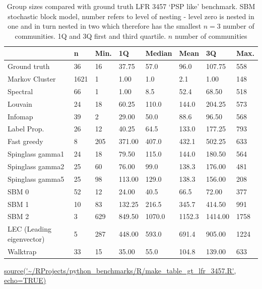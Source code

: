 \begin{table}[ht]
\centering
\setlength{\extrarowheight}{2pt}
\begin{tabular}{llllllll}
  \toprule
 & n & Min. & 1Q & Median & Mean & 3Q & Max. \\ 
  \midrule
Ground truth & 36 & 16 & 37.75 & 57.0 & 96.0 & 107.75 & 558 \\ 
Markov Cluster & 1621 & 1 & 1.00 & 1.0 & 2.1 & 1.00 & 148 \\ 
Spectral & 66 & 1 & 1.00 & 8.5 & 52.4 & 68.50 & 518 \\ 
 Louvain & 24 & 18 & 60.25 & 110.0 & 144.0 & 204.25 & 573 \\ 
 Infomap & 39 & 2 & 29.00 & 50.0 & 88.6 & 96.50 & 568 \\ 
 Label Prop. & 26 & 12 & 40.25 & 64.5 & 133.0 & 177.25 & 793 \\ 
 Fast greedy & 8 & 205 & 371.00 & 407.0 & 432.1 & 502.25 & 633 \\ 
 Spinglass gamma1 & 24 & 18 & 79.50 & 115.0 & 144.0 & 180.50 & 564 \\ 
 Spinglass gamma2 & 25 & 60 & 76.00 & 99.0 & 138.3 & 176.00 & 481 \\ 
 Spinglass gamma5 & 25 & 98 & 113.00 & 129.0 & 138.3 & 156.00 & 208 \\ 
 SBM 0 & 52 & 12 & 24.00 & 40.5 & 66.5 & 72.00 & 377 \\ 
 SBM 1 & 10 & 83 & 132.25 & 216.5 & 345.7 & 414.50 & 991 \\ 
 SBM 2 & 3 & 629 & 849.50 & 1070.0 & 1152.3 & 1414.00 & 1758 \\ 
 LEC (Leading eigenvector) & 5 & 287 & 448.00 & 593.0 & 691.4 & 905.00 & 1224 \\ 
 Walktrap & 33 & 15 & 35.00 & 55.0 & 104.8 & 139.00 & 633 \\ 
   \bottomrule
\end{tabular}
\caption{Group sizes compared with ground truth LFR 3457 `PSP like' benchmark. SBM stochastic block model, number refers to level of nesting - level zero is nested in one and in turn nested in two which therefore has the smallest $n=3$ number of communities. 1Q and 3Q first and third quartile. $n$ number of communities} 
\tiny\url{source('~/RProjects/python_benchmarks/R/make_table_gt_lfr_3457.R', echo=TRUE)}
\label{tab:Group sizes compared with ground truth LFR 3457 PSP like benchmark}
\end{table}

